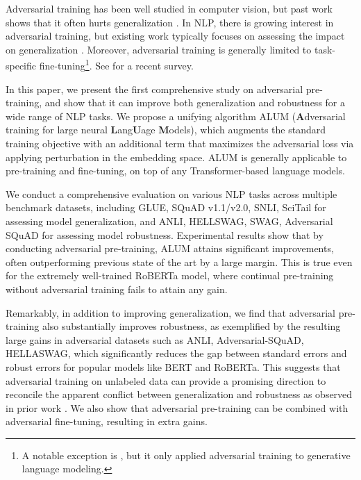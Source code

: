 \documentclass[11pt,a4paper]{article}
\newcommand\DNAME{ALUM}
\begin{document}
Adversarial training \cite{madry2017pgd,goodfellow2014explaining} has been well studied in computer vision, but past work shows that it often hurts generalization \cite{raghunathan2019adv-hurt,min2020curious}.
In NLP, there is growing interest in adversarial training, but existing work typically focuses on assessing the impact on generalization  \cite{zhu2019freelb,jiang2019smart,cheng-etal-2019-adv-nmt,wang2019adv-lm}. 
Moreover, adversarial training is generally limited to task-specific fine-tuning\footnote{A notable exception is , but it only applied adversarial training to generative language modeling.}. See  for a recent survey.

In this paper, we present the first comprehensive study on adversarial pre-training, and show that it can improve both generalization and robustness for a wide range of NLP tasks.
We propose a unifying algorithm {\DNAME} (\textbf{A}dversarial training for large neural \textbf{L}ang\textbf{U}age \textbf{M}odels), which augments the standard training objective with an additional term that maximizes the adversarial loss via applying perturbation in the embedding space.
{\DNAME} is generally applicable 
to pre-training and fine-tuning, on top of any Transformer-based language models. 

We conduct a comprehensive evaluation on various NLP tasks across multiple benchmark datasets, including GLUE, SQuAD v1.1/v2.0, SNLI, SciTail for assessing model generalization, and ANLI, HELLSWAG, SWAG, Adversarial SQuAD for assessing model robustness.   
Experimental results show that by conducting adversarial pre-training, {\DNAME} attains significant improvements, often outperforming previous state of the art by a large margin.
This is true even for the extremely well-trained RoBERTa model, where continual pre-training without adversarial training fails to attain any gain.

Remarkably, in addition to improving generalization, we find that adversarial pre-training also substantially improves robustness, as exemplified by the resulting large gains in adversarial datasets such as ANLI, Adversarial-SQuAD, HELLASWAG, which significantly reduces the gap between standard errors and robust errors for popular models like BERT and RoBERTa. This suggests that adversarial training on unlabeled data can provide a promising direction to reconcile the apparent conflict between generalization and robustness as observed in prior work \cite{raghunathan2019adv-hurt,min2020curious}.
We also show that adversarial pre-training can be combined with adversarial fine-tuning, resulting in extra gains. 
\end{document}

